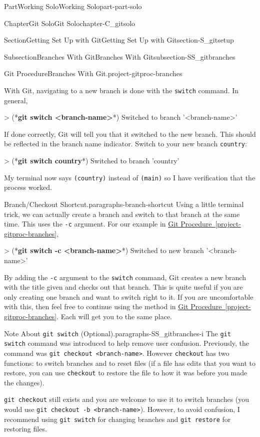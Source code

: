 \documentclass[oneside,10pt,]{book}
\newcommand{\xreffont}{\relax}
\newcommand{\mono}[1]{\texttt{#1}}
\newcommand{\consoleinput}[1]{\textbf{#1}}
\begin{document}
\begin{partptx}{Part}{Working Solo}{}{Working Solo}{}{}{part-part-solo}
\begin{chapterptx}{Chapter}{Git Solo}{}{Git Solo}{}{}{chapter-C_gitsolo}
\begin{sectionptx}{Section}{Getting Set Up with Git}{}{Getting Set Up with Git}{}{}{section-S_gitsetup}
\begin{subsectionptx}{Subsection}{Branches With Git}{}{Branches With Git}{}{}{subsection-SS_gitbranches}
\begin{project}{Git Procedure}{Branches With Git.}{project-gitproc-branches}
\begin{enumerate}[font=\bfseries,label=(\alph*),ref=\alph*]
\par
With Git, navigating to a new branch is done with the \mono{switch} command. In general,%
\begin{console}{0}{1}{0}
> (*\consoleinput{git switch <branch-name>}*)
Switched to branch '<branch-name>'
\end{console}
If done correctly, Git will tell you that it switched to the new branch. This should be reflected in the branch name indicator. Switch to your new branch \mono{country}:%
\begin{console}{0}{1}{0}
> (*\consoleinput{git switch country}*)
Switched to branch 'country'
\end{console}
My terminal now says \mono{(country)} instead of \mono{(main)} so I have verification that the process worked.%
\end{enumerate}%
\end{project}%
\begin{paragraphs}{Branch\slash{}Checkout Shortcut.}{paragraphs-branch-shortcut}%
Using a little terminal trick, we can actually create a branch and switch to that branch at the same time. This uses the \mono{-c} argument. For our example in \hyperref[project-gitproc-branches]{Git Procedure~{\xreffont\ref{project-gitproc-branches}}},%
\begin{console}{0}{1}{0}
> (*\consoleinput{git switch -c <branch-name>}*)
Switched to new branch '<branch-name>'
\end{console}
By adding the \mono{-c} argument to the \mono{switch} command, Git creates a new branch with the title given and checks out that branch. This is quite useful if you are only creating one branch and want to switch right to it. If you are uncomfortable with this, then feel free to continue using the method in \hyperref[project-gitproc-branches]{Git Procedure~{\xreffont\ref{project-gitproc-branches}}}. Each will get you to the same place.%
\end{paragraphs}%
\begin{paragraphs}{Note About \mono{git switch} (Optional).}{paragraphs-SS_gitbranches-i}%
The \mono{git switch} command was introduced to help remove user confusion. Previously, the command was \mono{git checkout <branch-name>}. However \mono{checkout} has two functions: to switch branches and to reset files (if a file has edits that you want to restore, you can use \mono{checkout} to restore the file to how it was before you made the changes).%
\par
\mono{git checkout} still exists and you are welcome to use it to switch branches (you would use \mono{git checkout -b <branch-name>}). However, to avoid confusion, I recommend using \mono{git switch} for changing branches and \mono{git restore} for restoring files.%

\end{paragraphs}
\end{subsectionptx}
\end{sectionptx}
\end{chapterptx}
\end{partptx}
\end{document}
